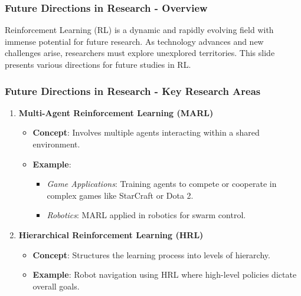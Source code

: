 \documentclass[aspectratio=169]{beamer}
\begin{document}
\begin{frame}[fragile]
  \frametitle{Future Directions in Research - Overview}
  Reinforcement Learning (RL) is a dynamic and rapidly evolving field with immense potential for future research. As technology advances and new challenges arise, researchers must explore unexplored territories. This slide presents various directions for future studies in RL.
\end{frame}

\begin{frame}[fragile]
  \frametitle{Future Directions in Research - Key Research Areas}
  \begin{enumerate}
    \item \textbf{Multi-Agent Reinforcement Learning (MARL)}
      \begin{itemize}
        \item \textbf{Concept}: Involves multiple agents interacting within a shared environment.
        \item \textbf{Example}: 
          \begin{itemize}
            \item \textit{Game Applications}: Training agents to compete or cooperate in complex games like StarCraft or Dota 2.
            \item \textit{Robotics}: MARL applied in robotics for swarm control.
          \end{itemize}
      \end{itemize}
    \item \textbf{Hierarchical Reinforcement Learning (HRL)}
      \begin{itemize}
        \item \textbf{Concept}: Structures the learning process into levels of hierarchy.
        \item \textbf{Example}: Robot navigation using HRL where high-level policies dictate overall goals.
      \end{itemize}
  \end{enumerate}
\end{frame}
\end{document}
